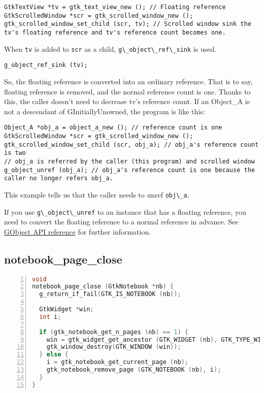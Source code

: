 \begin{lstlisting}
GtkTextView *tv = gtk_text_view_new (); // Floating reference
GtkScrolledWindow *scr = gtk_scrolled_window_new ();
gtk_scrolled_window_set_child (scr, tv); // Scrolled window sink the tv's floating reference and tv's reference count becomes one.
\end{lstlisting}

When \passthrough{\lstinline!tv!} is added to
\passthrough{\lstinline!scr!} as a child,
\passthrough{\lstinline!g\_object\_ref\_sink!} is used.

\begin{lstlisting}
g_object_ref_sink (tv);
\end{lstlisting}

So, the floating reference is converted into an ordinary reference. That
is to say, floating reference is removed, and the normal reference count
is one. Thanks to this, the caller doesn't need to decrease tv's
reference count. If an Object\_A is not a descendant of
GInitiallyUnowned, the program is like this:

\begin{lstlisting}
Object_A *obj_a = object_a_new (); // reference count is one
GtkScrolledWindow *scr = gtk_scrolled_window_new ();
gtk_scrolled_window_set_child (scr, obj_a); // obj_a's reference count is two
// obj_a is referred by the caller (this program) and scrolled window
g_object_unref (obj_a); // obj_a's reference count is one because the caller no longer refers obj_a.
\end{lstlisting}

This example tells us that the caller needs to unref
\passthrough{\lstinline!obj\_a!}.

If you use \passthrough{\lstinline!g\_object\_unref!} to an instance
that has a floating reference, you need to convert the floating
reference to a normal reference in advance. See
\href{https://docs.gtk.org/gobject/floating-refs.html}{GObject API
reference} for further information.

\subsection{notebook\_page\_close}\label{notebook_page_close}

\begin{lstlisting}[language=C, numbers=left]
void
notebook_page_close (GtkNotebook *nb) {
  g_return_if_fail(GTK_IS_NOTEBOOK (nb));

  GtkWidget *win;
  int i;

  if (gtk_notebook_get_n_pages (nb) == 1) {
    win = gtk_widget_get_ancestor (GTK_WIDGET (nb), GTK_TYPE_WINDOW);
    gtk_window_destroy(GTK_WINDOW (win));
  } else {
    i = gtk_notebook_get_current_page (nb);
    gtk_notebook_remove_page (GTK_NOTEBOOK (nb), i);
  }
}
\end{lstlisting}

